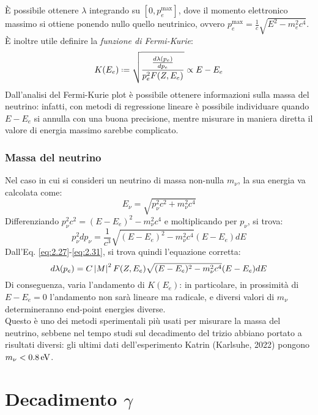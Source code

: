 È possibile ottenere $ \lambda $ integrando su $ [0, p_e^{\text{max}}] $, dove il momento elettronico massimo si ottiene ponendo nullo quello neutrinico, ovvero $ p_e^{\text{max}} = \frac{1}{c} \sqrt{E^2 - m_e^2 c^4} $.\\
È inoltre utile definire la \textit{funzione di Fermi-Kurie}:
\begin{equation}
	K(E_e) \defeq \sqrt{\frac{\frac{d\lambda(p_e)}{dp_e}}{p_e^2 F(Z,E_e)}} \propto E - E_e
	\label{eq:2.32}
\end{equation}
Dall'analisi del Fermi-Kurie plot è possibile ottenere informazioni sulla massa del neutrino: infatti, con metodi di regressione lineare è possibile individuare quando $ E - E_e $ si annulla con una buona precisione, mentre misurare in maniera diretta il valore di energia massimo sarebbe complicato.

\subsubsection{Massa del neutrino}

Nel caso in cui si consideri un neutrino di massa non-nulla $ m_{\nu} $, la sua energia va calcolata come:
\begin{equation}
	E_{\nu} = \sqrt{p_{\nu}^2 c^2 + m_{\nu}^2 c^4}
	\label{eq:2.33}
\end{equation}
Differenziando $ p_{\nu}^2 c^2 = (E - E_e)^2 - m_{\nu}^2 c^4 $ e moltiplicando per $ p_{\nu} $, si trova:
\begin{equation}
	p_{\nu}^2 dp_{\nu} = \frac{1}{c^3} \sqrt{(E - E_e)^2 - m_{\nu}^2 c^4} (E - E_e) dE
	\label{eq:2.34}
\end{equation}
Dall'Eq. \ref{eq:2.27}-\ref{eq:2.31}, si trova quindi l'equazione corretta:
\begin{equation}
	d\lambda(p_e) = C \left\lvert M\right\rvert^2 F(Z,E_e) \sqrt{(E - E_e)^2 - m_{\nu}^2 c^4} (E - E_e) dE
	\label{eq:2.35}
\end{equation}
Di conseguenza, varia l'andamento di $ K(E_e) $: in particolare, in prossimità di $ E - E_e = 0 $ l'andamento non sarà lineare ma radicale, e diversi valori di $ m_{\nu} $ determineranno end-point energies diverse.\\
Questo è uno dei metodi sperimentali più usati per misurare la massa del neutrino, sebbene nel tempo studi sul decadimento del trizio abbiano portato a risultati diversi: gli ultimi dati dell'esperimento Katrin (Karlsuhe, 2022) pongono $ m_{\nu} < 0.8 \,\mathrm{eV} $.

\section{Decadimento \texorpdfstring{$ \gamma $}{TEXT}}

